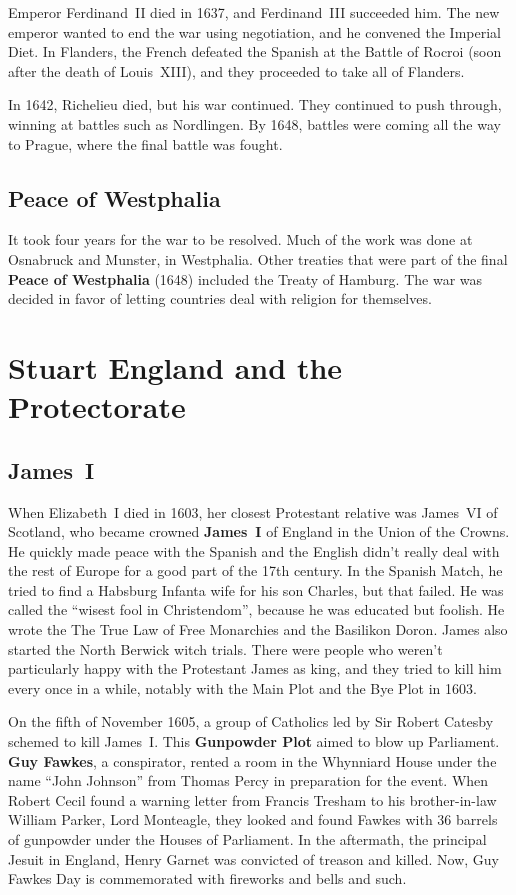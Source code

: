 Emperor Ferdinand~II died in 1637, and Ferdinand~III succeeded him.
The new emperor wanted to end the war using negotiation, and he convened the Imperial Diet.
In Flanders, the French defeated the Spanish at the Battle of Rocroi (soon after the death of Louis~XIII),
and they proceeded to take all of Flanders.

In 1642, Richelieu died, but his war continued.
They continued to push through, winning at battles such as Nordlingen.
By 1648, battles were coming all the way to Prague, where the final battle was fought.

\subsection*{Peace of Westphalia}

It took four years for the war to be resolved.
Much of the work was done at Osnabruck and Munster, in Westphalia.
Other treaties that were part of the final \textbf{Peace of Westphalia} (1648)
included the Treaty of Hamburg.
The war was decided in favor of letting countries deal with religion for themselves.

\section{Stuart England and the Protectorate}

\subsection*{James~I}

When Elizabeth~I died in 1603, her closest Protestant relative was
James~VI of Scotland, who became crowned \textbf{James~I} of England in the Union of the Crowns.
He quickly made peace with the Spanish
and the English didn't really deal with the rest of Europe for a good part of the 17th century.
In the Spanish Match, he tried to find a Habsburg Infanta wife for his son Charles, but that failed.
He was called the ``wisest fool in Christendom'', because he was educated but foolish.
He wrote the The True Law of Free Monarchies and the Basilikon Doron.
James also started the North Berwick witch trials.
There were people who weren't particularly happy with the Protestant James as king,
and they tried to kill him every once in a while, notably with the Main Plot and the Bye Plot in 1603.

On the fifth of November 1605, a group of Catholics led by Sir Robert Catesby schemed to kill James~I.
This \textbf{Gunpowder Plot} aimed to blow up Parliament.
\textbf{Guy Fawkes}, a conspirator, rented a room in the Whynniard House
under the name ``John Johnson'' from Thomas Percy in preparation for the event.
When Robert Cecil found a warning letter from Francis Tresham to his brother-in-law William Parker, Lord Monteagle,
they looked and found Fawkes with 36 barrels of gunpowder under the Houses of Parliament.
In the aftermath, the principal Jesuit in England, Henry Garnet was convicted of treason and killed.
Now, Guy Fawkes Day is commemorated with fireworks and bells and such.

